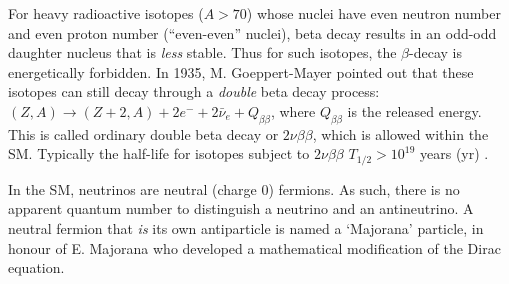 For heavy radioactive isotopes ($A>70$) whose nuclei have even neutron number and even proton number (``even-even'' nuclei), beta decay results in an odd-odd daughter nucleus that is {\em less} stable. Thus for such isotopes, the $\beta$-decay is energetically forbidden. In 1935, M. Goeppert-Mayer pointed out that these isotopes can still decay through a {\em double} beta decay process: $(Z,A) \to (Z+2,A)+2e^{-}+2\bar{\nu}_e+Q_{\beta\beta}$, where $Q_{\beta\beta}$ is the released energy. This is called ordinary double beta decay or $2\nu\beta\beta$, which is allowed within the SM. Typically the  half-life for isotopes subject to $2\nu\beta\beta$ $T_{1/2}>10^{19}$ years (yr) \cite{povh2008particles,martin2019nuclear}.

In the SM, neutrinos are neutral (charge 0) fermions. As such, there is no apparent quantum number to distinguish a neutrino and an antineutrino\cite{akhmedov2014majorana}. A neutral fermion that {\em is} its own antiparticle is named a `Majorana' particle, in honour of E. Majorana who developed a mathematical modification of the Dirac equation\cite{majorana2006symmetric}.

